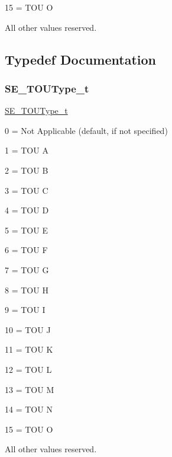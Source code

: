 15 = T\+OU O

All other values reserved. 

\subsection{Typedef Documentation}
\mbox{\label{group__TOUType_gadcfd871f87df34ae8228b9484ebedc6a}} 
\subsubsection{\texorpdfstring{S\+E\+\_\+\+T\+O\+U\+Type\+\_\+t}{SE\_TOUType\_t}}
{\footnotesize\ttfamily \hyperlink{group__TOUType_gadcfd871f87df34ae8228b9484ebedc6a}{S\+E\+\_\+\+T\+O\+U\+Type\+\_\+t}}

0 = Not Applicable (default, if not specified)

1 = T\+OU A

2 = T\+OU B

3 = T\+OU C

4 = T\+OU D

5 = T\+OU E

6 = T\+OU F

7 = T\+OU G

8 = T\+OU H

9 = T\+OU I

10 = T\+OU J

11 = T\+OU K

12 = T\+OU L

13 = T\+OU M

14 = T\+OU N

15 = T\+OU O

All other values reserved. 